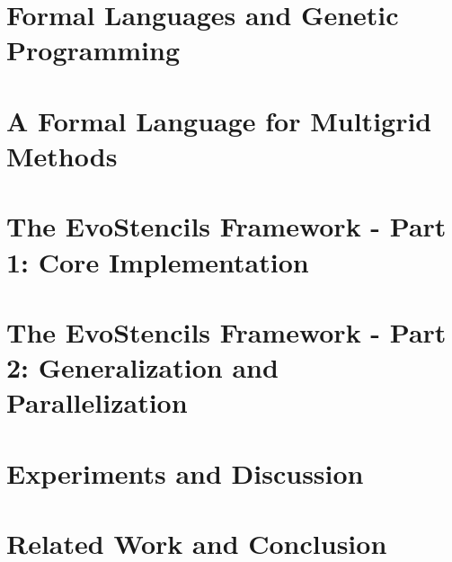 \documentclass[
  paper = 17x24,
  language = english,
  acronym = split,
  acronymline = novertical,
  bibliography = combined,
  bibliographypart = all,
  titlesize = Huge,
  par = halfskip,
]{faupress}
\theoremstyle{definition}
\begin{document}
\chapter{Formal Languages and Genetic Programming}
\label{chapter:formal-languages-and-gp}
  
  
\chapter{A Formal Language for Multigrid Methods}
\label{chapter:multigrid-formal-language}
  
\chapter{The EvoStencils Framework - Part 1: Core Implementation}
\label{chapter:evostencils-1}
  
  \label{chapter:evostencils-2}
\chapter{The EvoStencils Framework - Part 2: Generalization and Parallelization}
  
\chapter{Experiments and Discussion}
\label{chapter:experiments}
  
\chapter{Related Work and Conclusion}
  
  


\appendix 
  
  
    
\backmatter
  \faupressprintbibliography
\end{document}
